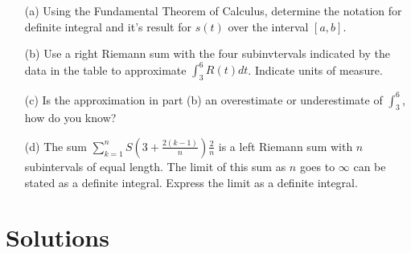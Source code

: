 \documentclass{article}
\newcommand{\qspace}{\vspace*{1.7em}}
\begin{document}
    \begin{enumerate}
        
        \item[(a)] Using the Fundamental Theorem of Calculus, determine the notation for definite integral and it's result 
                   for $s(t)$ over the interval $[a, b]$. \qspace 
        \item[(b)] Use a right Riemann sum with the four subinvtervals indicated by the data in the table to 
                   approximate $\int_3^6 R(t)dt$. Indicate units of measure. \qspace
        \item[(c)] Is the approximation in part (b) an overestimate or underestimate of $\int_3^6$, how do you know? \qspace
        \item[(d)] The sum $\sum_{k = 1}^n S\left(3 + \frac{2(k - 1)}{n}\right)\frac{2}{n}$ is a left Riemann sum with $n$ subintervals of equal length. 
                   The limit of this sum as $n$ goes to $\infty$ can be stated as a definite integral. Express the limit as a definite integral.

    \end{enumerate}
    \newpage



    \section*{Solutions}
\end{document}
